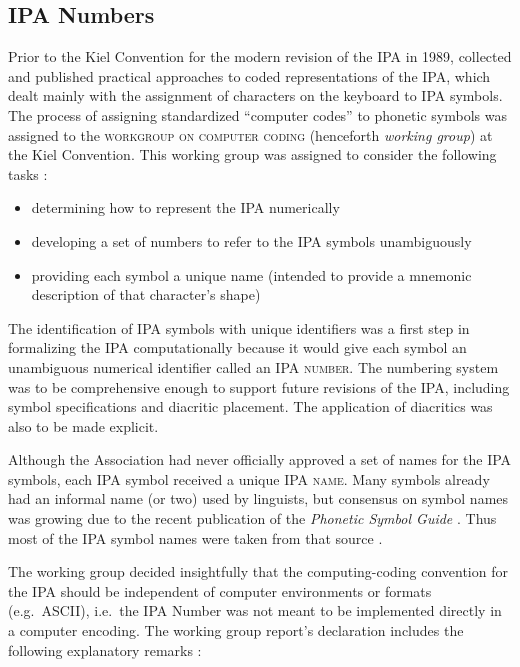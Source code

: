 \subsection*{IPA Numbers}
Prior to the Kiel Convention for the modern revision of the IPA in 1989,
\citet{Wells1987} collected and published practical approaches to coded
representations of the IPA, which dealt mainly with the assignment of characters
on the keyboard to IPA symbols. The process of assigning standardized ``computer
codes'' to phonetic symbols was assigned to the \textsc{workgroup on computer
coding} (henceforth \textit{working group}) at the Kiel Convention. This working
group was assigned to consider the following tasks
\citep{Esling1990,EslingGaylord1993}: 

\begin{itemize}
	\item determining how to represent the IPA numerically
	\item developing a set of numbers to refer to the IPA symbols unambiguously
	\item providing each symbol a unique name (intended to provide a mnemonic description of that character's shape)
\end{itemize}

\noindent The identification of IPA symbols with unique identifiers was 
a first step in formalizing the IPA computationally because it would give 
each symbol an unambiguous numerical identifier called an \textsc{IPA number}. 
The numbering system was to be comprehensive enough to support future revisions 
of the IPA, including symbol specifications and diacritic placement. The 
application of diacritics was also to be made explicit. 

Although the Association had never officially approved a set of names 
for the IPA symbols, each IPA symbol received a unique \textsc{IPA name}. 
Many symbols already had an informal name (or two) used by linguists, but 
consensus on symbol names was growing due to the recent publication of the 
\textit{Phonetic Symbol Guide} \citep{PullumLadusaw1986}. Thus most of the 
IPA symbol names were taken from that source \citep[31]{IPA1999}.

The working group decided insightfully that the computing-coding convention 
for the IPA should be independent of computer environments or formats (e.g.\ ASCII), 
i.e.\ the IPA Number was not meant to be implemented directly in a computer 
encoding. The working group report's declaration includes the following explanatory 
remarks \citep[82]{International1989report}:

